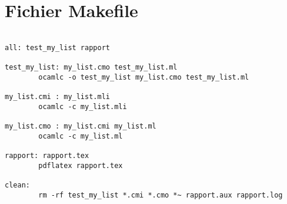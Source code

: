 \documentclass{article}
\begin{document}
\section{Fichier Makefile}
\begin{lstlisting}

all: test_my_list rapport

test_my_list: my_list.cmo test_my_list.ml
        ocamlc -o test_my_list my_list.cmo test_my_list.ml

my_list.cmi : my_list.mli
        ocamlc -c my_list.mli

my_list.cmo : my_list.cmi my_list.ml
        ocamlc -c my_list.ml

rapport: rapport.tex
        pdflatex rapport.tex

clean:
        rm -rf test_my_list *.cmi *.cmo *~ rapport.aux rapport.log

\end{lstlisting}
\end{document}
